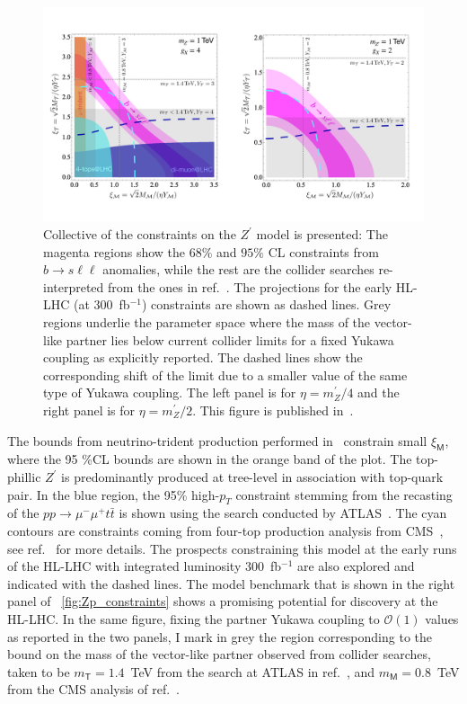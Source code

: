 \begin{figure}[htpb!]
	\includegraphics[scale=0.235]{figures/Zprime_constraint_CLu.pdf}
	\caption{ Collective of the constraints on the $Z^\prime$ model is presented: The magenta regions show the  $68\%$ and $ 95\%$ CL  constraints from $ b \to s \ell \ell$ anomalies, while the rest are the collider searches re-interpreted from the ones in ref.~\cite{Camargo-Molina:2018cwu}. The projections for the early HL-LHC  (at 300~fb$^{-1}$) constraints are shown as dashed lines. Grey regions underlie the parameter space where the mass of the vector-like partner lies below current collider limits for a fixed Yukawa coupling as explicitly reported. The dashed lines show the corresponding shift of the limit due to a smaller value of the same type of Yukawa coupling. The left panel is for $\eta = m_Z^\prime /4$
		and the right panel is for $\eta = m_Z^\prime /2$. This figure is published in~\cite{Alasfar:2020mne}.}
	\label{fig:Zp_constraints}
\end{figure}
The bounds from neutrino-trident production performed in~\cite{Mishra:1991bv} constrain small $\xi_{\mathsf{M}}$, where the 95 \%CL bounds are shown in the orange band of the plot.  The top-phillic $Z^{\prime}$  is predominantly produced at tree-level in association with top-quark pair. In the blue region, the 95\% high-$p_{T}$ constraint stemming from the recasting of the $p p \to \mu^{-} \mu^{+} t \bar{t} $ is shown using the search conducted by ATLAS~\cite{Aaboud:2017buh,ATLAS-CONF-2019-001}. The cyan contours are constraints coming from four-top production analysis from CMS~\cite{Sirunyan:2017roi}, see ref.~\cite{Camargo-Molina:2018cwu} for more details.  The prospects  constraining this model at the early runs of the HL-LHC  with integrated luminosity 300~fb$^{-1}$ are also explored and indicated with the dashed lines. The model benchmark that is shown in the right panel of ~\autoref{fig:Zp_constraints} shows a promising potential for discovery at the HL-LHC. 
In the same figure, fixing the partner Yukawa coupling to  $\mathcal{O}(1)$ values as reported in the two panels, I mark in grey the region corresponding to the bound on the mass of the vector-like partner observed from collider searches, taken to be $m_{\mathsf{T}} = 1.4$~TeV from the search at ATLAS in ref.~\cite{Aaboud:2018uek}, and $m_{\mathsf{M}} = 0.8$~TeV from the CMS analysis of ref.~\cite{Sirunyan:2019ofn}.\\
